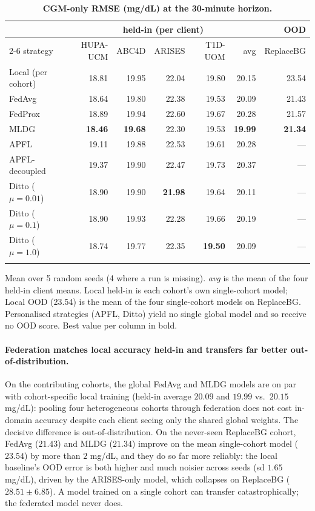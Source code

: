 \documentclass[10pt,letterpaper]{article}
\newlength\savedwidth
\newcommand\thickhline{\noalign{\global\savedwidth\arrayrulewidth\global\arrayrulewidth 2pt}%
\hline
\noalign{\global\arrayrulewidth\savedwidth}}
\begin{document}
\begin{table}[!ht]
\centering
\captionsetup{justification=centering,singlelinecheck=on}
\caption{\bf CGM-only RMSE (mg/dL) at the 30-minute horizon.}
\label{tab:main}
\begin{tabular}{lrrrrrr}
\thickhline
 & \multicolumn{5}{c}{held-in (per client)} & OOD \\
\cline{2-6}
strategy & HUPA-UCM & ABC4D & ARISES & T1D-UOM & avg & ReplaceBG \\
\hline
Local (per cohort) & 18.81 & 19.95 & 22.04 & 19.80 & 20.15 & 23.54 \\
\hline
FedAvg  & 18.64 & 19.80 & 22.38 & 19.53 & 20.09 & 21.43 \\
FedProx & 18.89 & 19.94 & 22.60 & 19.67 & 20.28 & 21.57 \\
MLDG    & \textbf{18.46} & \textbf{19.68} & 22.30 & 19.53 & \textbf{19.99} & \textbf{21.34} \\
\hline
APFL          & 19.11 & 19.88 & 22.53 & 19.61 & 20.28 & --- \\
APFL-decoupled & 19.37 & 19.90 & 22.47 & 19.73 & 20.37 & --- \\
Ditto ($\mu{=}0.01$) & 18.90 & 19.90 & \textbf{21.98} & 19.64 & 20.11 & --- \\
Ditto ($\mu{=}0.1$)  & 18.90 & 19.93 & 22.28 & 19.66 & 20.19 & --- \\
Ditto ($\mu{=}1.0$)  & 18.74 & 19.77 & 22.35 & \textbf{19.50} & 20.09 & --- \\
\thickhline
\end{tabular}
\begin{center}
{\small Mean over 5 random seeds (4 where a run is missing). \emph{avg} is the
mean of the four held-in client means. Local held-in is each cohort's own
single-cohort model; Local OOD (23.54) is the mean of the four single-cohort
models on ReplaceBG. Personalised strategies (APFL, Ditto) yield no single
global model and so receive no OOD score. Best value per column in bold.}
\end{center}
\end{table}

\paragraph{Federation matches local accuracy held-in and transfers far better
out-of-distribution.} On the contributing cohorts, the global FedAvg and MLDG
models are on par with cohort-specific local training (held-in average $20.09$
and $19.99$ vs.\ $20.15$ mg/dL): pooling four heterogeneous cohorts through
federation does not cost in-domain accuracy despite each client seeing only the
shared global weights. The decisive difference is out-of-distribution. On the
never-seen ReplaceBG cohort, FedAvg ($21.43$) and MLDG ($21.34$) improve on the
mean single-cohort model ($23.54$) by more than $2$ mg/dL, and they do so far
more reliably: the local baseline's OOD error is both higher and much noisier
across seeds (sd $1.65$ mg/dL), driven by the ARISES-only model, which collapses
on ReplaceBG ($28.51 \pm 6.85$). A model trained on a single cohort can transfer
catastrophically; the federated model never does.
\end{document}
